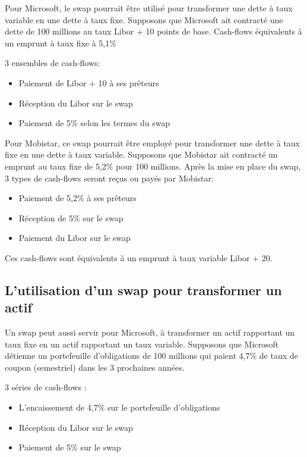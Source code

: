 	Pour Microsoft, le swap pourrait être utilisé pour transformer une dette à 
taux variable en une dette à taux fixe.  Supposons que Microsoft ait contracté une dette de 100 millions au taux Libor + 10 points de base. Cash-flows équivalents à un emprunt à taux fixe à 5,1\% 

	3 ensembles de cash-flows: 
	\begin{itemize}
		\item Paiement de Libor + 10 à ses prêteurs 
		\item Réception du Libor sur le swap 
		\item Paiement de 5\% selon les termes du swap
	\end{itemize}

	Pour Mobistar, ce swap pourrait être employé pour transformer une dette à taux fixe en une dette à taux variable. Supposons que Mobistar ait contracté un emprunt au taux fixe de 5,2\% pour 100 millions.  Après la mise en place du swap, 3 types de cash-flows seront reçus ou payés par Mobistar: 
	\begin{itemize}
		\item Paiement de 5,2\% à ses prêteurs 
		\item Réception de 5\% sur le swap 
		\item Paiement du Libor sur le swap 
	\end{itemize}

	Ces cash-flows sont équivalents à un emprunt à taux variable Libor + 20.
	

	\subsection{L'utilisation d'un swap pour transformer un actif}

	
	Un swap peut aussi servir pour Microsoft, à transformer un actif rapportant un taux fixe en un actif rapportant un taux variable. Supposons que Microsoft détienne un portefeuille d'obligations de 100 millions qui paient 4,7\% de taux de coupon (semestriel) dans les 3 prochaines années.
	
	3 séries de cash-flows :
	
	\begin{itemize}
		\item L'encaissement de 4,7\% sur le portefeuille d'obligations 
		\item Réception du Libor sur le swap 
		\item Paiement de 5\% sur le swap 
	\end{itemize}

